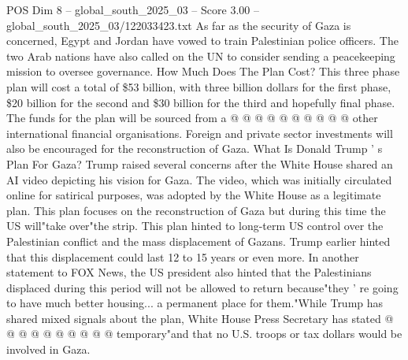 \begin{textsample}{POS Dim 8 – global\_south\_2025\_03 – Score 3.00 – global\_south\_2025\_03/122033423.txt}
As far as the security of Gaza is concerned, Egypt and Jordan have vowed to train Palestinian police officers.
The two Arab nations have also called on the UN to consider sending a peacekeeping mission to oversee governance.
How Much Does The Plan Cost?
This three phase plan will cost a total of \$53 billion, with three billion dollars for the first phase, \$20 billion for the second and \$30 billion for the third and hopefully final phase.
The funds for the plan will be sourced from a @ @ @ @ @ @ @ @ @ @ other international financial organisations.
Foreign and private sector investments will also be encouraged for the reconstruction of Gaza.
What Is Donald Trump ' s Plan For Gaza?
Trump raised several concerns after the White House shared an AI video depicting his vision for Gaza.
The video, which was initially circulated online for satirical purposes, was adopted by the White House as a legitimate plan.
This plan focuses on the reconstruction of Gaza but during this time the US will"take over"the strip.
This plan hinted to long-term US control over the Palestinian conflict and the mass displacement of Gazans.
Trump earlier hinted that this displacement could last 12 to 15 years or even more.
In another statement to FOX News, the US president also hinted that the Palestinians displaced during this period will not be allowed to return because"they ' re going to have much better housing... a permanent place for them."While Trump has shared mixed signals about the plan, White House Press Secretary has stated @ @ @ @ @ @ @ @ @ @ temporary"and that no U.S. troops or tax dollars would be involved in Gaza.

\end{textsample}
